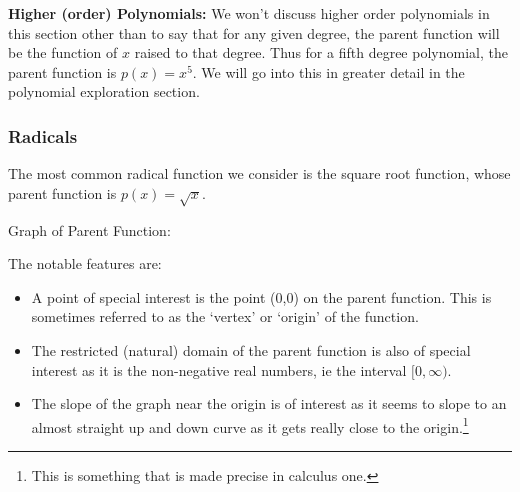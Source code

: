 \documentclass{ximeraXloud}
\begin{document}
        \textbf{Higher (order) Polynomials:} We won't discuss higher order polynomials in this section other than to say that for any given degree, the parent function will be the function of $x$ raised to that degree. Thus for a fifth degree polynomial, the parent function is $p(x) = x^5$. We will go into this in greater detail in the polynomial exploration section.


    \subsubsection*{Radicals}
        \begin{description}
            \item[Parent Function:] The most common radical function we consider is the square root function, whose parent function is $p(x) = \sqrt{x}$.\\
            \begin{minipage}{\textwidth}\item[Graph of Parent Function:]\hspace*{0pt} \\
                \begin{center}
                \end{center}
            \end{minipage}
            \item[Notable Features of Graph:] The notable features are:
            \begin{itemize}
                \item A point of special interest is the point (0,0) on the parent function. This is sometimes referred to as the `vertex' or `origin' of the function.
                \item The restricted (natural) domain of the parent function is also of special interest as it is the non-negative real numbers, ie the interval $[0,\infty)$.
                \item The slope of the graph near the origin is of interest as it seems to slope to an almost straight up and down curve as it gets really close to the origin.\footnote{This is something that is made precise in calculus one.}

\end{itemize}
\end{description}
\end{document}
